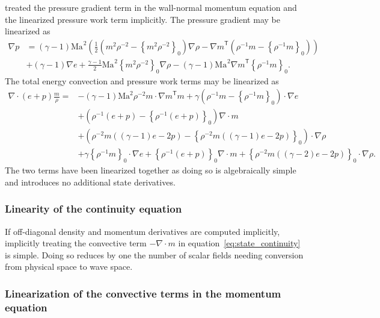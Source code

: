\documentclass[letterpaper,11pt,nointlimits,reqno,draft]{amsart}
\newcommand{\trans}[1]{{#1}^{\ensuremath{\mathsf{T}}}}
\newcommand{\Mach}[1][]{\ensuremath{\mbox{Ma}_{#1}}}
\newcommand{\reference}[1]{\ensuremath{\left\{#1\right\}_{0}}}
\newcommand{\lessreference}[1]
  {\ensuremath{\left({#1}-\reference{#1}\right)}}
\begin{document}
\citet[page~45]{Guarini1998} treated the pressure gradient term in the
wall-normal momentum equation and the linearized pressure work term implicitly.
The pressure gradient may be linearized as
\begin{align}
  \nabla{}p &= \left(\gamma-1\right)\Mach^{2}\left(
      \frac{1}{2} \lessreference{m^{2}\rho^{-2}}\nabla\rho
    - \trans{\nabla{}m}\lessreference{\rho^{-1}m}
  \right)
\\
&+ \left(\gamma-1\right) \nabla{}e
 + \frac{\gamma-1}{2}\Mach^{2} \reference{m^{2}\rho^{-2}}\nabla\rho
 - \left(\gamma-1\right)\Mach^{2} \trans{\nabla{}m}\reference{\rho^{-1}m}
 .
\end{align}
The total energy convection and pressure work terms may be linearized as
\begin{align}
\nabla\cdot\left(e+p\right)\frac{m}{\rho} =
   &- \left(\gamma-1\right)\mbox{Ma}^{2}\rho^{-2}m\cdot \trans{\nabla{}m}m
    + \gamma\lessreference{ \rho^{-1}m }\cdot\nabla{}e
  \\
   &+ \lessreference{
        \rho^{-1}\left(e+p\right)
      } \nabla\cdot{}m
  \\
   &+ \lessreference{
        \rho^{-2}m\left(\left(\gamma-1\right)e-2p\right)
      }\cdot\nabla\rho
  \\
   &+ \gamma\reference{
        \rho^{-1}m
      }\cdot\nabla{}e
    + \reference{
        \rho^{-1}\left(e+p\right)
      }\nabla\cdot{}m
    + \reference{
        \rho^{-2}m\left(\left(\gamma-2\right)e-2p\right)
      }\cdot\nabla\rho
.
\end{align}
The two terms have been linearized together as doing so is algebraically simple
and introduces no additional state derivatives.

\subsubsection{Linearity of the continuity equation}
\label{sec:contconv}

If off-diagonal density and momentum derivatives are computed implicitly,
implicitly treating the convective term $-\nabla\cdot{}m$ in
equation~\eqref{eq:state_continuity} is simple.  Doing so reduces by one the
number of scalar fields needing conversion from physical space to wave space.

\subsubsection{Linearization of the convective terms in the momentum equation}
\label{sec:momtconv}
\end{document}
